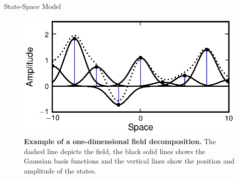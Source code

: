 \documentclass[final]{beamer}
\newlength{\onecolwid}
\begin{document}
\begin{frame}[t]
\begin{columns}[t]
\begin{column}{\onecolwid}
\begin{block}{State-Space Model}
	\begin{figure}	
	\begin{center}
	  \includegraphics[width=9in, scale = 10]{Figure2.eps}
	\end{center}
	\caption{{\bf Example of a one-dimensional field decomposition.} The dashed line depicts the field, the black solid lines shows the Gaussian basis functions and the vertical lines show the position and amplitude of the states.} 
	\label{fig:Figure2}	
	\end{figure}
\end{block}
\end{column}
\end{columns}
\end{frame}
\end{document}
